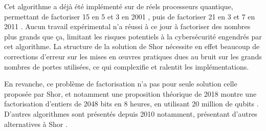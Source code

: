 \medbreak

Cet algorithme a déjà été implémenté sur de réels processeurs quantique, permettant de factoriser 15 en 5 et 3 en 2001 \cite{Vandersypen01}, puis de factoriser 21 en 3 et 7 en 2011 \cite{Martin11}. Aucun travail expérimental n'a réussi à ce jour à factoriser des nombres plus grands que ça, limitant les risques potentiels à la cybersécurité engendrés par cet algorithme. La structure de la solution de Shor nécessite en effet beaucoup de corrections d'erreur sur les mises en \oe{}uvres pratiques dues au bruit sur les grands nombres de portes utilisées, ce qui complexifie et ralentit les implémentations.

En revanche, ce problème de factorisation n'a pas pour seule solution celle proposée par Shor, et notamment une proposition théorique de 2018 montre une factorisation d'entiers de 2048 bits en 8 heures, en utilisant 20 million de qubits \cite{gidney2019factor}. D'autres algorithmes sont présentés depuis 2010 notamment, présentant d'autres alternatives à Shor \cite{anschuetz2018variational}.